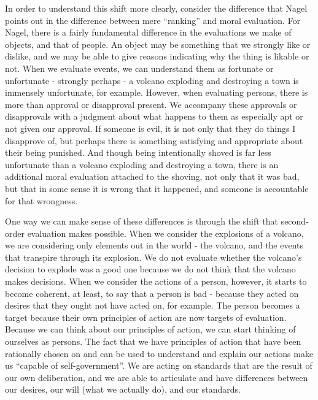 \documentclass[phd,12pt,oneside,paper=letterpaper]{ubcthesis}
\begin{document}
In order to understand this shift more clearly, consider the difference that Nagel \citeyearpar{nagel1979b} points out in the difference between mere ``ranking'' and moral evaluation. For Nagel, there is a fairly fundamental difference in the evaluations we make of objects, and that of people. An object may be something that we strongly like or dislike, and we may be able to give reasons indicating why the thing is likable or not. When we evaluate events, we can understand them as fortunate or unfortunate - strongly perhaps - a volcano exploding and destroying a town is immensely unfortunate, for example. However, when evaluating persons, there is more than approval or disapproval present. We accompany these approvals or disapprovals with a judgment about what happens to them as especially apt or not given our approval. If someone is evil, it is not only that they do things I disapprove of, but perhaps there is something satisfying and appropriate about their being punished. And though being intentionally shoved is far less unfortunate than a volcano exploding and destroying a town, there is an additional moral evaluation attached to the shoving, not only that it was bad, but that in some sense it is wrong that it happened, and someone is accountable for that wrongness. 

One way we can make sense of these differences is through the shift that second-order evaluation makes possible. When we consider the explosions of a volcano, we are considering only elements out in the world - the volcano, and the events that transpire through its explosion. We do not evaluate whether the volcano's decision to explode was a good one because we do not think that the volcano makes decisions. When we consider the actions of a person, however, it starts to become coherent, at least, to say that a person is bad - because they acted on desires that they ought not have acted on, for example. The person becomes a target because their own principles of action are now targets of evaluation. Because we can think about our principles of action, we can start thinking of ourselves as persons. The fact that we have principles of action that have been rationally chosen on and can be used to understand and explain our actions make us ``capable of self-government''. We are acting on standards that are the result of our own deliberation, and we are able to articulate and have differences between our desires, our will (what we actually do), and our standards. 
\end{document}
